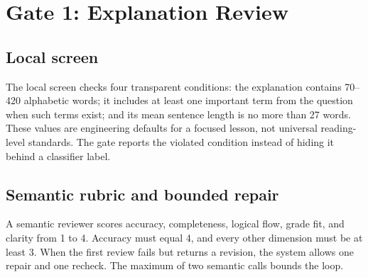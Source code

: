 \documentclass[11pt]{article}
\theoremstyle{plain}
\theoremstyle{definition}
\begin{document}
\section{Gate 1: Explanation Review}

\subsection{Local screen}

The local screen checks four transparent conditions: the explanation contains 70--420 alphabetic words; it includes at least one important term from the question when such terms exist; and its mean sentence length is no more than 27 words. These values are engineering defaults for a focused lesson, not universal reading-level standards. The gate reports the violated condition instead of hiding it behind a classifier label.

\subsection{Semantic rubric and bounded repair}

A semantic reviewer scores accuracy, completeness, logical flow, grade fit, and clarity from 1 to 4. Accuracy must equal 4, and every other dimension must be at least 3. When the first review fails but returns a revision, the system allows one repair and one recheck. The maximum of two semantic calls bounds the loop.
\end{document}
